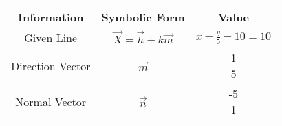 \begin{tabular}[12pt]{|c|c|c|}
    \hline
	\textbf{Information} & \textbf{Symbolic Form} & \textbf{Value}\\ 
    \hline
	Given Line & $\vec{X} = \vec{h}+k\vec{m}$ & $x-\frac{y}{5}-10=10$ \\
    \hline 
	Direction Vector & $\vec{m}$ & \myvec{1 \\ 5} \\
    \hline
	Normal Vector & $\vec{n}$ & \myvec{-5 \\ 1} \\
    \hline   
    \end{tabular}
